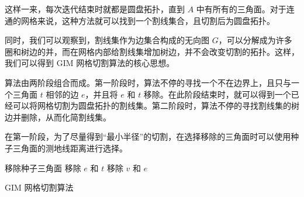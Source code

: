 这样一来，每次迭代结束时就都是圆盘拓扑，直到 $ A $ 中有所有的三角面。对于连通的网格来说，这种方法就可以找到一个割线集合，且切割后为圆盘拓扑。

同时，我们可以观察到，割线集作为边集合构成的无向图 $ G $，可以分解成为许多圈和树边的并，而在网格内部给割线集增加树边，并不会改变切割的拓扑。这样，我们可以得到 GIM 网格切割算法的核心思想。

算法由两阶段组合而成。第一阶段时，算法不停的寻找一个不在边界上，且只与一个三角面 $ t $ 相邻的边 $ e $，并且将 $ e $ 和 $ t $ 移除。在此阶段结束时，就可以得到一个已经可以将网格切割为圆盘拓扑的割线集。第二阶段时，算法不停的寻找割线集的树边并删除，从而化简割线集。

在第一阶段，为了尽量得到“最小半径”的切割，在选择移除的三角面时可以使用种子三角面的测地线距离进行选择。

\begin{algorithm}[h]
    \SetAlgoLined

    移除种子三角面\;
     {
      移除 $ e $ 和 $ t $\;
    }
     {
      移除 $ v $ 和 $ e $\;
    }
    \caption{GIM 网格切割算法}
\end{algorithm}



